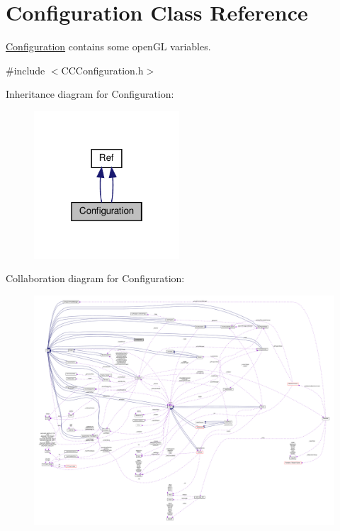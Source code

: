 \hypertarget{classConfiguration}{}\section{Configuration Class Reference}
\label{classConfiguration}


\hyperlink{classConfiguration}{Configuration} contains some open\+GL variables.  




{\ttfamily \#include $<$C\+C\+Configuration.\+h$>$}



Inheritance diagram for Configuration\+:
\nopagebreak
\begin{figure}[H]
\begin{center}
\leavevmode
\includegraphics[width=154pt]{classConfiguration__inherit__graph}
\end{center}
\end{figure}


Collaboration diagram for Configuration\+:
\nopagebreak
\begin{figure}[H]
\begin{center}
\leavevmode
\includegraphics[width=350pt]{classConfiguration__coll__graph}
\end{center}
\end{figure}
